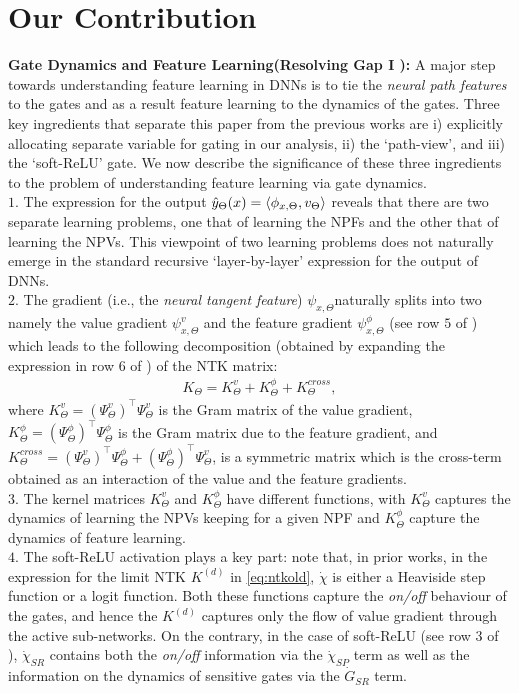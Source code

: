 \section{Our Contribution}
\textbf{Gate Dynamics and Feature Learning(Resolving Gap I ):}
A major step towards understanding feature learning in DNNs is to tie the \emph{neural path features} to the gates and as a result feature learning to the dynamics of the gates. Three key ingredients that separate this paper from the previous works are i) explicitly allocating separate variable for gating in our analysis, ii) the `path-view', and iii) the `soft-ReLU' gate. We now describe the significance of these three ingredients to the problem of understanding feature learning via gate dynamics.\\
$1.$ The expression for the output $\hat{y}_{\Theta}(x)=\langle \phi_{x,\Theta},v_{\Theta}\rangle$ reveals that there are two separate learning problems, one that of learning the NPFs and the other that of learning the NPVs. This viewpoint of two learning problems does not naturally emerge in the standard recursive `layer-by-layer' expression for the output of DNNs.\\
$2.$ The gradient (i.e., the \emph{neural tangent feature}) $\psi_{x,\Theta} $naturally splits into two namely the value gradient $\psi^v_{x,\Theta}$ and the feature gradient $\psi^{\phi}_{x,\Theta}$ (see row $5$ of ) which leads to the following  decomposition (obtained by expanding the expression in  row $6$ of ) of the NTK matrix:
\begin{align}
K_{\Theta}=K^v_{\Theta}+K^{\phi}_{\Theta}+K^{cross}_{\Theta},
\end{align}
where $K^v_{\Theta}=(\Psi^v_{\Theta})^\top \Psi^v_{\Theta}$ is the Gram matrix of the value gradient, $K^{\phi}_{\Theta}=(\Psi^{\phi}_{\Theta})^\top \Psi^{\phi}_{\Theta}$ is the Gram matrix due to the feature gradient, and $K^{cross}_{\Theta}=(\Psi^v_\Theta)^\top \Psi^{\phi}_{\Theta} +(\Psi^{\phi}_\Theta)^\top \Psi^{v}_{\Theta}$, is a symmetric matrix which is the cross-term obtained as an interaction of the value and the feature gradients.\\
$3.$ The kernel matrices $K^v_{\Theta}$ and $K^{\phi}_{\Theta}$ have different functions, with $K^v_{\Theta}$ captures the dynamics of learning the NPVs keeping for a given NPF and $K^{\phi}_{\Theta}$ capture the dynamics of feature learning.\\
$4.$ The soft-ReLU activation plays a key part: note that, in prior works, in the expression for the limit NTK $K^{(d)}$ in \eqref{eq:ntkold}, $\dot{\chi}$ is either a Heaviside step function or a logit function. Both these functions capture the \emph{on/off} behaviour of the gates, and hence the $K^{(d)}$ captures only the flow of value gradient through the active sub-networks. On the contrary, in the case of soft-ReLU (see row $3$ of ), $\dot{\chi}_{SR}$ contains both the \emph{on/off} information via the $\dot{\chi}_{SP}$ term as well as the information on the dynamics of sensitive gates via the $\dot{G}_{SR}$ term.
